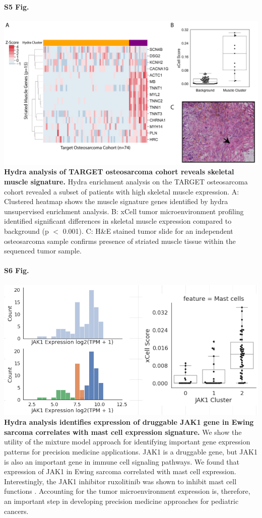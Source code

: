 \documentclass[10pt,letterpaper]{article}
\begin{document}
\paragraph*{S5 Fig.}
\includegraphics[width=\textwidth]{img/muscle-signature-genes-2x}
\label{S5_Fig} {\bf Hydra analysis of TARGET osteosarcoma cohort reveals skeletal muscle signature.} Hydra enrichment analysis on the TARGET osteosarcoma cohort revealed a subset of patients with high skeletal muscle expression. A: Clustered heatmap shows the muscle signature genes identified by hydra unsupervised enrichment analysis. B: xCell tumor microenvironment profiling identified significant differences in skeletal muscle expression compared to background (p $<$ 0.001). C: H\&E stained tumor slide for an independent osteosarcoma sample confirms presence of striated muscle tissue within the sequenced tumor sample.

\paragraph*{S6 Fig.}
\includegraphics[width=\textwidth]{img/Selection_026}
\label{S6_Fig} {\bf Hydra analysis identifies expression of druggable JAK1 gene in Ewing sarcoma correlates with mast cell expression signature.} We show the utility of the mixture model approach for identifying important gene expression patterns for precision medicine applications. JAK1 is a druggable gene, but JAK1 is also an important gene in immune cell signaling pathways. We found that expression of JAK1 in Ewing sarcoma correlated with mast cell expression. Interestingly, the JAK1 inhibitor ruxolitinib was shown to inhibit mast cell functions \cite{hermansJAK1JAK2Inhibitor2018}. Accounting for the tumor microenvironment expression is, therefore, an important step in developing precision medicine approaches for pediatric cancers.
\end{document}
